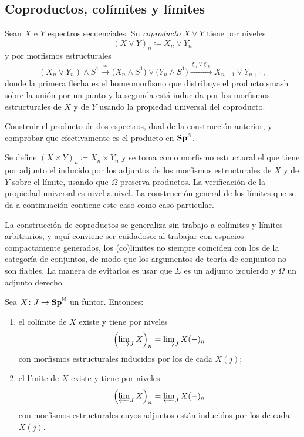 \subsection{Coproductos, colímites y límites}

\begin{defi}\label{defi:coproducto-espectros}
Sean $X$ e $Y$ espectros secuenciales. Su \emph{coproducto} $X\vee Y$ tiene por niveles
\[
(X\vee Y)_n\coloneqq X_n\vee Y_n
\]
y por morfismos estructurales
\[
(X_n\vee Y_n)\wedge S^1\xrightarrow{\ \cong\ }\bigl(X_n\wedge S^1\bigr)\vee\bigl(Y_n\wedge S^1\bigr)\xrightarrow{\ \xi_n\vee\xi'_n\ }X_{n+1}\vee Y_{n+1},
\]
donde la primera flecha es el homeomorfismo que distribuye el producto smash sobre la unión por un punto y la segunda está inducida por los morfismos estructurales de $X$ y de $Y$ usando la propiedad universal del coproducto.
\end{defi}

\begin{ejer}\label{ejer:producto-espectros}
Construir el producto de dos espectros, dual de la construcción anterior, y comprobar que efectivamente es el producto en $\mathbf{Sp}^{\mathbb{N}}$.
\end{ejer}

\begin{sol}
Se define $(X\times Y)_n\coloneqq X_n\times Y_n$ y se toma como morfismo estructural el que tiene por adjunto el inducido por los adjuntos de los morfismos estructurales de $X$ y de $Y$ sobre el límite, usando que $\Omega$ preserva productos. La verificación de la propiedad universal es nivel a nivel. La construcción general de los límites que se da a continuación contiene este caso como caso particular.
\end{sol}

La construcción de coproductos se generaliza sin trabajo a colímites y límites arbitrarios, y aquí conviene ser cuidadoso: al trabajar con espacios compactamente generados, los (co)límites no siempre coinciden con los de la categoría de conjuntos, de modo que los argumentos de teoría de conjuntos no son fiables. La manera de evitarlos es usar que $\Sigma$ es un adjunto izquierdo y $\Omega$ un adjunto derecho.

\begin{prop}\label{prop:colimites-espectros}
Sea $X\colon J\to\mathbf{Sp}^{\mathbb{N}}$ un funtor. Entonces:
\begin{enumerate}
\item el colímite de $X$ existe y tiene por niveles
\[
\Bigl(\varinjlim\nolimits_J X\Bigr)_n=\varinjlim\nolimits_J X(-)_n 
\]
con morfismos estructurales inducidos por los de cada $X(j)$;
\item el límite de $X$ existe y tiene por niveles
\[
\Bigl(\varprojlim\nolimits_J X\Bigr)_n=\varprojlim\nolimits_J X(-)_n 
\]
con morfismos estructurales cuyos adjuntos están inducidos por los de cada $X(j)$.
\end{enumerate}
\end{prop}

